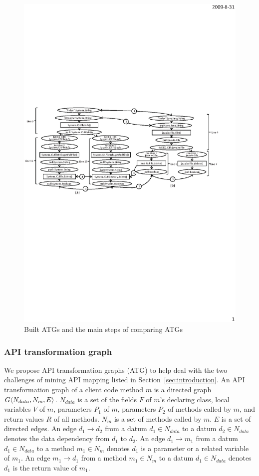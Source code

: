\begin{figure}[t]
\centering
\includegraphics[scale=1.1,clip]{figure/graph.eps}\vspace*{-3ex}
 \caption
{\label{fig:graph}Built ATGs and the main steps of comparing
ATGs}\vspace*{-3.5ex}
\end{figure}


\subsubsection{API transformation graph}
We propose API transformation graphs (ATG) to help deal with the two
challenges of mining API mapping listed in
Section~\ref{sec:introduction}. An API transformation graph of a
client code method $m$ is a directed graph
$G\langle N_{data}, N_{m}, E \rangle$. $N_{data}$ is a set of the fields
$F$ of $m$'s declaring class, local variables $V$ of $m$, parameters
$P_1$ of $m$, parameters $P_2$ of methods called by $m$, and return
values $R$ of all methods. $N_{m}$ is a set of methods called by
$m$. $E$ is a set of directed edges. An edge $d_1\rightarrow d_2$
from a datum $d_1 \in N_{data}$ to a datum $d_2 \in N_{data}$
denotes the data dependency from $d_1$ to $d_2$. An edge $d_1
\rightarrow m_1$ from a datum $d_1 \in N_{data}$  to a method $ m_1
\in N_{m}$ denotes $d_1$ is a parameter or a related variable of
$m_1$. An edge $m_1 \rightarrow d_1$ from a method $m_1 \in N_{m}$
to a datum $d_1 \in N_{data}$ denotes $d_1$ is the return value of
$m_1$.

